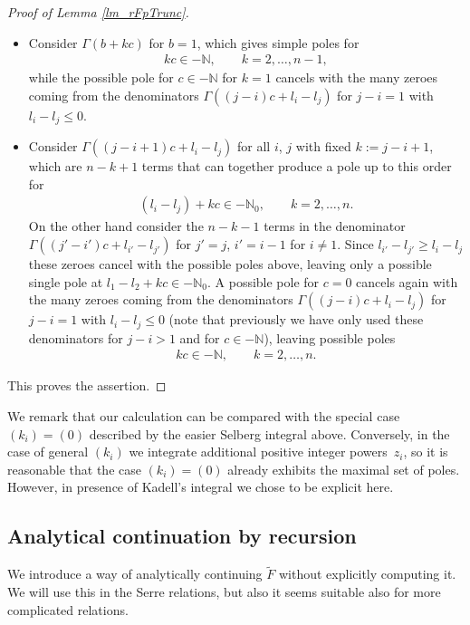 \documentclass[pdftex]{sigma}%
\numberwithin{equation}{section}
\newcommand{\N}{\mathbb{N}}
\newcommand{\Sel}{\mathrm{Sel}}
\newcommand{\rFp}{\tilde{\mathrm{F}}}
\begin{document}
\begin{proof}[Proof of Lemma \ref{lm_rFpTrunc}]
\begin{itemize}
		We remark that the poles in $\Sel$ depending on $m_i$ must always disappear in $\rFp$, because $\rFp$ is a contour integral avoiding the singularity at $z_i=0$.
		\item Consider $\Gamma(b+kc)$ for $b=1$, which gives simple poles for
		\begin{gather*}
		kc  \in -\N,  \qquad k=2,\dots,n-1,
		\end{gather*}
		while the possible pole for $c\in -\N$ for $k=1$ cancels with the many zeroes coming from the denominators $\Gamma((j-i)c+l_i-l_j)$ for $j-i=1$ with $l_i-l_j\leq 0$.
		\item Consider $\Gamma((j-i+1)c+l_i-l_j)$ for all $i$, $j$ with fixed $k:=j-i+1$, which are $n-k+1$ terms that can together produce a pole up to this order for
		\begin{gather*}
		(l_i-l_j) + kc \in -\N_0, \qquad k=2,\dots,n.
		\end{gather*}
		On the other hand consider the $n-k-1$ terms in the denominator $\Gamma((j'-i')c+l_{i'}-l_{j'})$ for $j'=j$, $i'=i-1$ for $i\neq 1$. Since $l_{i'}-l_{j'}\geq l_i-l_j$ these zeroes cancel with the possible poles above, leaving only a possible single pole at $l_1-l_2+kc\in -\N_0$. A possible pole for $c=0$ cancels again with the many zeroes coming from the denominators $\Gamma((j-i)c+l_i-l_j)$ for $j-i=1$ with $l_i-l_j \leq 0$ (note that previously we have only used these denominators for $j-i>1$ and for $c\in -\N$), leaving possible poles
		\begin{gather*}
		kc \in -\N, \qquad k=2,\dots,n.
		\end{gather*}
	\end{itemize} 	
	This proves the assertion.
\end{proof}

We remark that our calculation can be compared with the special case $(k_i)=(0)$ described by the easier Selberg integral above. Conversely, in the case of general $(k_i)$ we integrate additional positive integer powers~$z_i$, so it is reasonable that the case $(k_i)=(0)$ already exhibits the maximal set of poles. However, in presence of Kadell's integral we chose to be explicit here.

\subsection{Analytical continuation by recursion}\label{sec_recursion}

We introduce a way of analytically continuing $\tilde{F}$ without explicitly computing it. We will use this in the Serre relations, but also it seems suitable also for more complicated relations.
\end{document}
